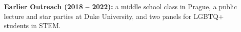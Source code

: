
\textbf{Earlier Outreach (2018 -- 2022):} a middle school class in Prague, a public lecture and star parties at Duke University, and two panels for LGBTQ+ students in STEM.
